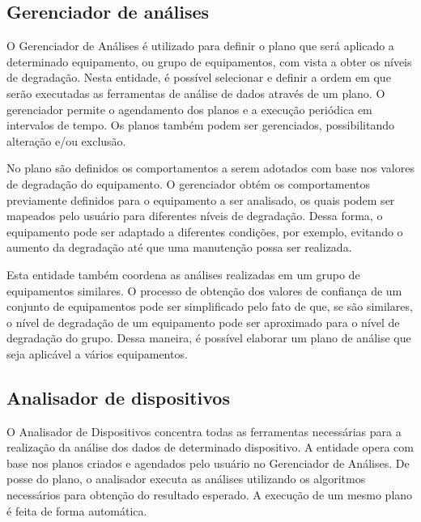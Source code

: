 

\subsection{Gerenciador de análises}

O Gerenciador de Análises é utilizado para definir o plano que será aplicado a determinado
equipamento, ou grupo de equipamentos, com vista a obter os níveis de degradação.
Nesta entidade, é possível selecionar e definir a ordem em que serão executadas as ferramentas de
análise de dados através de um plano. O gerenciador permite o agendamento dos planos e a execução
periódica em intervalos de tempo. Os planos também podem ser gerenciados, possibilitando alteração
e/ou exclusão.

No plano são definidos os comportamentos a serem adotados com base nos valores de degradação do
equipamento. O gerenciador obtém os comportamentos previamente definidos para o equipamento a ser
analisado, os quais podem ser mapeados pelo usuário para diferentes níveis de degradação. Dessa
forma, o equipamento pode ser adaptado a diferentes condições, por exemplo, evitando o aumento da
degradação até que uma manutenção possa ser realizada.

Esta entidade também coordena as análises realizadas em um grupo de equipamentos similares. O
processo de obtenção dos valores de confiança de um conjunto de equipamentos pode ser simplificado
pelo fato de que, se são similares, o nível de degradação de um equipamento pode ser aproximado para
o nível de degradação do grupo. Dessa maneira, é possível elaborar um plano de análise que seja
aplicável a vários equipamentos.



\subsection{Analisador de dispositivos}

O Analisador de Dispositivos concentra todas as ferramentas necessárias para a realização da análise
dos dados de determinado dispositivo. A entidade opera com base nos planos criados e agendados pelo
usuário no Gerenciador de Análises. De posse do plano, o analisador
executa as análises utilizando os algoritmos necessários para obtenção do resultado esperado. A
execução de um mesmo plano é feita de forma automática.

